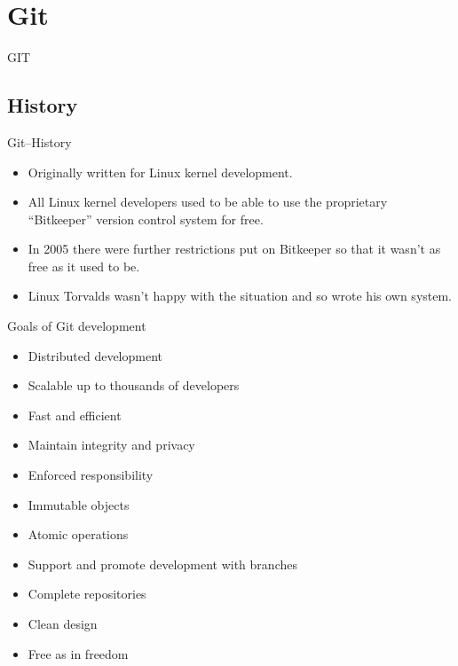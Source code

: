 \section{Git}

\begin{frame}
\begin{center}
\vspace{5em}
\Huge GIT
\end{center}
\end{frame}
\subsection{History}
\begin{frame}{Git--History}
\begin{itemize}
    \item Originally written for Linux kernel development.
    \item All Linux kernel developers used to be able to use the proprietary
	``Bitkeeper'' version control system for free.
    \item In 2005 there were further restrictions put on Bitkeeper so that
	it wasn't as free as it used to be.
    \item Linux Torvalds wasn't happy with the situation and so wrote his
	own system.
\end{itemize}
\end{frame}

\begin{frame}{Goals of Git development}
\begin{itemize}
    \item Distributed development
    \item Scalable up to thousands of developers
    \item Fast and efficient
    \item Maintain integrity and privacy
    \item Enforced responsibility
    \item Immutable objects
    \item Atomic operations
    \item Support and promote development with branches
    \item Complete repositories
    \item Clean design
    \item Free as in freedom
\end{itemize}
\end{frame}

